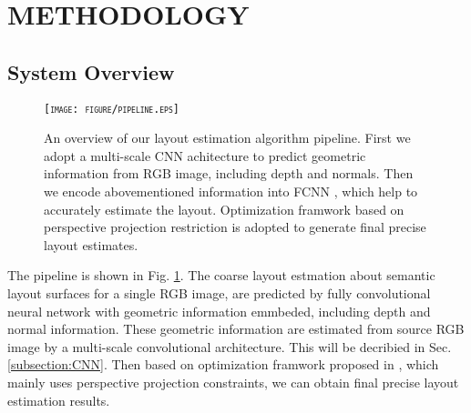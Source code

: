 \section{METHODOLOGY}
\label{sec:Meth}
\subsection{System Overview}
\label{subsection:overview}

\begin{figure}[!htq]
	\centering
	\textsc{\texttt{[image: figure/pipeline.eps]}}
	\caption{An overview of our layout estimation algorithm pipeline. First we adopt a multi-scale CNN achitecture to predict geometric information from RGB image, including depth and normals. Then we encode abovementioned information into FCNN , which help to accurately estimate the layout. Optimization framwork based on perspective projection restriction is adopted to generate final precise layout estimates.}
	\label{fig:pipeline}
\end{figure}

The pipeline is shown in Fig. \ref{fig:pipeline}. The coarse layout estmation about semantic layout surfaces for a single RGB image, are predicted by fully convolutional neural network with geometric information emmbeded, including depth and normal information. These geometric information are estimated from source RGB image by a multi-scale convolutional architecture\cite{eigen2015predicting}. This will be decribied in Sec. \ref{subsection:CNN}. Then based on optimization framwork proposed in \cite{dasgupta2016delay}, which mainly uses perspective projection constraints, we can obtain final precise layout estimation results.




